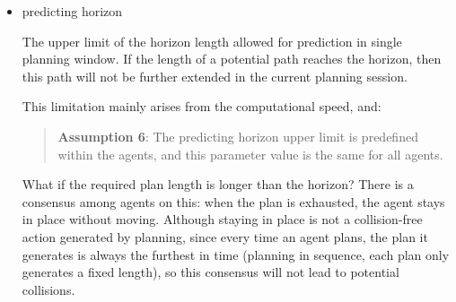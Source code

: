 \begin{itemize}
    \item predicting horizon
    
    The upper limit of the horizon length allowed for prediction in single planning window.
    If the length of a potential path reaches the horizon, then this path will not be further extended in the current planning session.
    
    This limitation mainly arises from the computational speed, and:
    \begin{quotation}
        \textbf{Assumption 6}: 
        The predicting horizon upper limit is predefined within the agents, and this parameter value is the same for all agents.
    \end{quotation}

    What if the required plan length is longer than the horizon? 
    There is a consensus among agents on this: 
    when the plan is exhausted, the agent stays in place without moving. 
    Although staying in place is not a collision-free action generated by planning, 
    since every time an agent plans, the plan it generates is always the furthest in time 
    (planning in sequence, each plan only generates a fixed length), 
    so this consensus will not lead to potential collisions.
\end{itemize}



